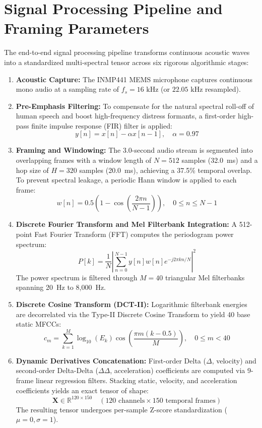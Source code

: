 \documentclass[12pt, a4paper]{report}
\begin{document}
\section{Signal Processing Pipeline and Framing Parameters}
The end-to-end signal processing pipeline transforms continuous acoustic waves into a standardized multi-spectral tensor across six rigorous algorithmic stages:
\begin{enumerate}
    \item \textbf{Acoustic Capture:} The INMP441 MEMS microphone captures continuous mono audio at a sampling rate of $f_s = 16\text{ kHz}$ (or $22.05\text{ kHz}$ resampled).
    \item \textbf{Pre-Emphasis Filtering:} To compensate for the natural spectral roll-off of human speech and boost high-frequency distress formants, a first-order high-pass finite impulse response (FIR) filter is applied:
    \begin{equation}
    y[n] = x[n] - \alpha x[n-1], \quad \alpha = 0.97
    \end{equation}
    \item \textbf{Framing and Windowing:} The 3.0-second audio stream is segmented into overlapping frames with a window length of $N = 512$ samples (32.0~ms) and a hop size of $H = 320$ samples (20.0~ms), achieving a 37.5\% temporal overlap. To prevent spectral leakage, a periodic Hann window is applied to each frame:
    \begin{equation}
    w[n] = 0.5 \left(1 - \cos\left(\frac{2\pi n}{N-1}\right)\right), \quad 0 \le n \le N-1
    \end{equation}
    \item \textbf{Discrete Fourier Transform and Mel Filterbank Integration:} A 512-point Fast Fourier Transform (FFT) computes the periodogram power spectrum:
    \begin{equation}
    P[k] = \frac{1}{N} \left| \sum_{n=0}^{N-1} y[n] w[n] e^{-j 2\pi k n / N} \right|^2
    \end{equation}
    The power spectrum is filtered through $M = 40$ triangular Mel filterbanks spanning 20~Hz to 8,000~Hz.
    \item \textbf{Discrete Cosine Transform (DCT-II):} Logarithmic filterbank energies are decorrelated via the Type-II Discrete Cosine Transform to yield 40 base static MFCCs:
    \begin{equation}
    c_m = \sum_{k=1}^{M} \log_{10}(E_k) \cos\left(\frac{\pi m (k - 0.5)}{M}\right), \quad 0 \le m < 40
    \end{equation}
    \item \textbf{Dynamic Derivatives Concatenation:} First-order Delta ($\Delta$, velocity) and second-order Delta-Delta ($\Delta\Delta$, acceleration) coefficients are computed via 9-frame linear regression filters. Stacking static, velocity, and acceleration coefficients yields an exact tensor of shape:
    \begin{equation}
    \mathbf{X} \in \mathbb{R}^{120 \times 150} \quad (120\text{ channels} \times 150\text{ temporal frames})
    \end{equation}
    The resulting tensor undergoes per-sample Z-score standardization ($\mu=0, \sigma=1$).
\end{enumerate}
\end{document}
